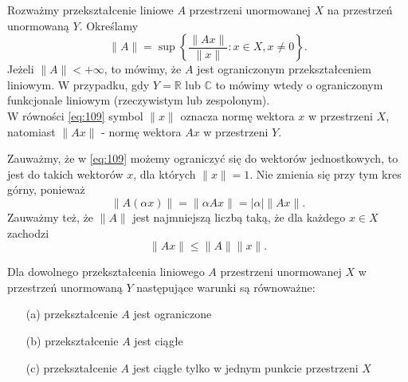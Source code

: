 \documentclass[leqno]{article}
\begin{document}
\begin{justify}
\begin{defn}
    Rozważmy przekształcenie liniowe \(A\) przestrzeni unormowanej \(X\) na przestrzeń unormowaną \(Y\). Określamy
    \begin{equation}\label{eq:109}
        \|A\|=\sup\left\{\frac{\|Ax\|}{\|x\|}:x\in X,x\neq0\right\}.
    \end{equation}
    Jeżeli \(\|A\|<+\infty\), to mówimy, że \(A\) jest ograniczonym przekształceniem liniowym. W przypadku, gdy \(Y=\mathbb{R}\) lub \(\mathbb{C}\) to mówimy wtedy o ograniczonym funkcjonale liniowym (rzeczywistym lub zespolonym). \\
W równości \ref{eq:109} symbol \(\|x\|\) oznacza normę wektora \(x\) w przestrzeni \(X\), natomiast \(\|Ax\|\) - normę wektora \(Ax\) w przestrzeni \(Y\).
\end{defn}

\begin{uwaga}
    Zauważmy, że w \ref{eq:109} możemy ograniczyć się do wektorów jednostkowych, to jest do takich wektorów \(x\), dla których \(\|x\|=1\). Nie zmienia się przy tym kres górny, ponieważ
    \[
        \|A(\alpha x)\|=\|\alpha Ax\|=|\alpha|\|Ax\|.
    \]
    Zauważmy też, że \(\|A\|\) jest najmniejszą liczbą taką, że dla każdego \(x\in X\) zachodzi
    \[
        \|Ax\| \leqslant \|A\|\|x\|.
    \]
\end{uwaga}

\begin{theorem}
{
    Dla dowolnego przekształcenia liniowego \(A\) przestrzeni unormowanej \(X\) w przestrzeń unormowaną \(Y\) następujące warunki są równoważne:
    \begin{enumerate}
        \item[(a)] przekształcenie \(A\) jest ograniczone
        \item[(b)] przekształcenie \(A\) jest ciągłe
        \item[(c)] przekształcenie \(A\) jest ciągłe tylko w jednym punkcie przestrzeni \(X\)
    \end{enumerate}
}
\end{theorem}


\end{justify}
\end{document}
